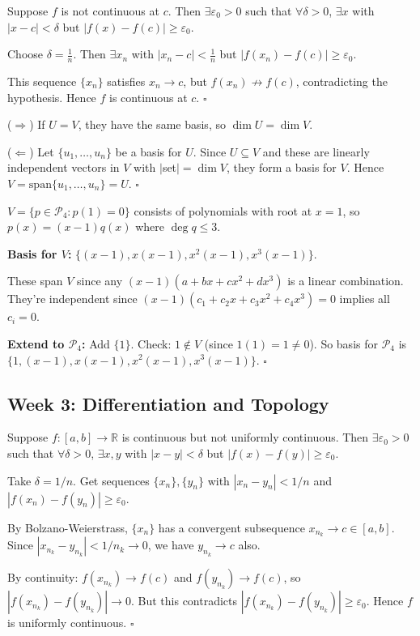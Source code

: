 \documentclass[11pt, letterpaper, openany]{book}
\newenvironment{solution}[1][Solution]{%
  \tcolorbox[blanker, breakable, left=1em,
    before skip=1em, after skip=1em,
    borderline west={2pt}{0pt}{MagicBlue},
    colback=MagicCream,
    before upper={\textcolor{MagicBlue}{\sffamily\bfseries #1.}\space}
  ]%
}{%
  \hfill\textcolor{MagicBlue}{\ensuremath{\square}}\endtcolorbox%
}
\begin{document}
\begin{solution}[2.3]
Suppose $f$ is not continuous at $c$. Then $\exists \varepsilon_0 > 0$ such that $\forall \delta > 0$, $\exists x$ with $|x - c| < \delta$ but $|f(x) - f(c)| \geq \varepsilon_0$.

Choose $\delta = \frac{1}{n}$. Then $\exists x_n$ with $|x_n - c| < \frac{1}{n}$ but $|f(x_n) - f(c)| \geq \varepsilon_0$.

This sequence $\{x_n\}$ satisfies $x_n \to c$, but $f(x_n) \not\to f(c)$, contradicting the hypothesis. Hence $f$ is continuous at $c$.
\end{solution}

\begin{solution}[2.5]
($\Rightarrow$) If $U = V$, they have the same basis, so $\dim U = \dim V$.

($\Leftarrow$) Let $\{u_1, \ldots, u_n\}$ be a basis for $U$. Since $U \subseteq V$ and these are linearly independent vectors in $V$ with $|$set$| = \dim V$, they form a basis for $V$. Hence $V = \text{span}\{u_1, \ldots, u_n\} = U$.
\end{solution}

\begin{solution}[2.7]
$V = \{p \in \mathcal{P}_4 : p(1) = 0\}$ consists of polynomials with root at $x = 1$, so $p(x) = (x-1)q(x)$ where $\deg q \leq 3$.

\textbf{Basis for $V$:} $\{(x-1), x(x-1), x^2(x-1), x^3(x-1)\}$.

These span $V$ since any $(x-1)(a + bx + cx^2 + dx^3)$ is a linear combination. They're independent since $(x-1)(c_1 + c_2 x + c_3 x^2 + c_4 x^3) = 0$ implies all $c_i = 0$.

\textbf{Extend to $\mathcal{P}_4$:} Add $\{1\}$. Check: $1 \notin V$ (since $1(1) = 1 \neq 0$). So basis for $\mathcal{P}_4$ is $\{1, (x-1), x(x-1), x^2(x-1), x^3(x-1)\}$.
\end{solution}

\subsection*{Week 3: Differentiation and Topology}

\begin{solution}[3.1]
Suppose $f: [a,b] \to \mathbb{R}$ is continuous but not uniformly continuous. Then $\exists \varepsilon_0 > 0$ such that $\forall \delta > 0$, $\exists x, y$ with $|x - y| < \delta$ but $|f(x) - f(y)| \geq \varepsilon_0$.

Take $\delta = 1/n$. Get sequences $\{x_n\}, \{y_n\}$ with $|x_n - y_n| < 1/n$ and $|f(x_n) - f(y_n)| \geq \varepsilon_0$.

By Bolzano-Weierstrass, $\{x_n\}$ has a convergent subsequence $x_{n_k} \to c \in [a,b]$. Since $|x_{n_k} - y_{n_k}| < 1/n_k \to 0$, we have $y_{n_k} \to c$ also.

By continuity: $f(x_{n_k}) \to f(c)$ and $f(y_{n_k}) \to f(c)$, so $|f(x_{n_k}) - f(y_{n_k})| \to 0$. But this contradicts $|f(x_{n_k}) - f(y_{n_k})| \geq \varepsilon_0$. Hence $f$ is uniformly continuous.
\end{solution}
\end{document}

